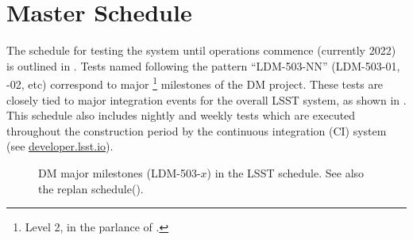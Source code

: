 \section{Master Schedule\label{sect:schedule}}

The schedule for testing the system until operations commence (currently 2022) is outlined in .
Tests named following the pattern ``LDM-503-NN'' (LDM-503-01, -02, etc) correspond to major \footnote{Level 2, in the parlance of .} milestones of the DM project.
These tests are closely tied to major integration events for the overall LSST system, as shown in .
This schedule also includes nightly and weekly tests which are executed throughout the construction period by the continuous integration (CI) system (see \url{developer.lsst.io}).



\begin{figure}[htbp]
\begin{center}

\end{center}
	\caption{DM major milestones (LDM-503-$x$) in the LSST schedule. See also the replan schedule().\label{fig:schedule}}
\end{figure}


